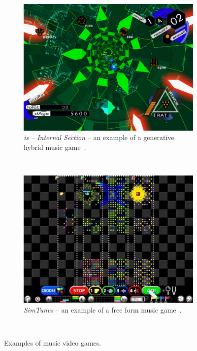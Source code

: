 \begin{figure}
        \centering
        \begin{subfigure}[b]{0.48\textwidth}
                \includegraphics[width=\textwidth]{Figures/is}
                \caption{\textit{is -- Internal Section} -- an example of a generative hybrid music game~\cite{is}.}
                \label{fig:is }
        \end{subfigure}%
        ~ %
        \begin{subfigure}[b]{0.48\textwidth}
                \includegraphics[width=\textwidth]{Figures/simtunes}
                \caption{\textit{SimTunes} -- an example of a free form music game~\cite{simtunes}.}
                \label{fig:simtunes}
        \end{subfigure}
          \caption{Examples of music video games.}
        ~ %
        \label{fig:simtunesandis}
\end{figure}


